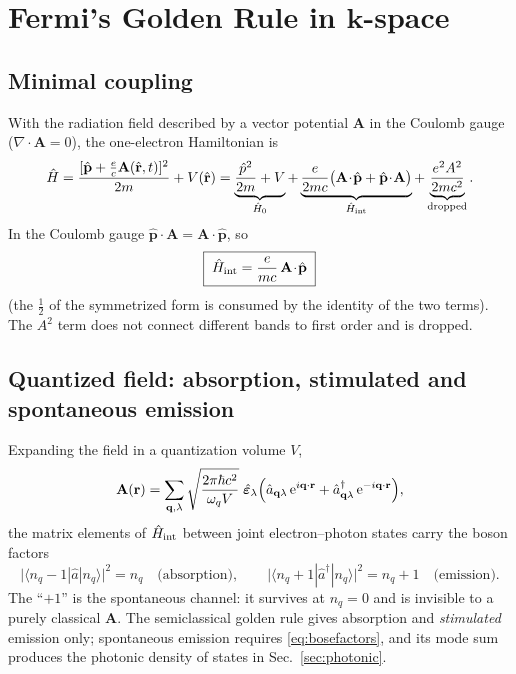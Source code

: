 \documentclass[11pt,a4paper]{article}
\numberwithin{equation}{section}
\begin{document}
\section{Fermi's Golden Rule in $\mathbf{k}$-space}\label{sec:fgr}

\subsection{Minimal coupling}

With the radiation field described by a vector potential $\mathbf{A}$
in the Coulomb gauge ($\nabla\!\cdot\!\mathbf{A}=0$), the one-electron
Hamiltonian is
\begin{equation}
\hat H=\frac{[\hat{\mathbf p}+\tfrac{e}{c}\mathbf A(\hat{\mathbf r},t)]^2}{2m}
       +V(\hat{\mathbf r})
      =\underbrace{\frac{\hat p^2}{2m}+V}_{\hat H_0}
       +\underbrace{\frac{e}{2mc}\bigl(\mathbf A\!\cdot\!\hat{\mathbf p}
        +\hat{\mathbf p}\!\cdot\!\mathbf A\bigr)}_{\hat H_{\rm int}}
       +\underbrace{\frac{e^2A^2}{2mc^2}}_{\text{dropped}} .
\end{equation}
In the Coulomb gauge $\hat{\mathbf p}\!\cdot\!\mathbf A
=\mathbf A\!\cdot\!\hat{\mathbf p}$, so
\begin{equation}
\boxed{\;\hat H_{\rm int}=\frac{e}{mc}\,\mathbf A\!\cdot\!\hat{\mathbf p}\;}
\label{eq:Hint}
\end{equation}
(the $\tfrac12$ of the symmetrized form is consumed by the identity of
the two terms).  The $A^2$ term does not connect different bands to
first order and is dropped.

\subsection{Quantized field: absorption, stimulated and spontaneous emission}
\label{sec:quantized}

Expanding the field in a quantization volume $V$,
\begin{equation}
\mathbf A(\mathbf r)=\sum_{\mathbf q,\lambda}
\sqrt{\frac{2\pi\hbar c^2}{\omega_q V}}\;\hat{\bm{\varepsilon}}_\lambda
\Bigl(\hat a_{\mathbf q\lambda}\,{\mathrm{e}}^{i\mathbf q\cdot\mathbf r}
     +\hat a^\dagger_{\mathbf q\lambda}\,{\mathrm{e}}^{-i\mathbf q\cdot\mathbf r}\Bigr),
\label{eq:Aquant}
\end{equation}
the matrix elements of $\hat H_{\rm int}$ between joint
electron--photon states carry the boson factors
\begin{equation}
\bigl|\langle n_q-1|\hat a|n_q\rangle\bigr|^2=n_q
\quad\text{(absorption)},\qquad
\bigl|\langle n_q+1|\hat a^\dagger|n_q\rangle\bigr|^2=n_q+1
\quad\text{(emission)} .
\label{eq:bosefactors}
\end{equation}
The ``$+1$'' is the spontaneous channel: it survives at $n_q=0$ and is
invisible to a purely classical $\mathbf A$.  The semiclassical golden
rule gives absorption and \emph{stimulated} emission only; spontaneous
emission requires \eqref{eq:bosefactors}, and its mode sum produces the
photonic density of states in Sec.~\ref{sec:photonic}.
\end{document}

